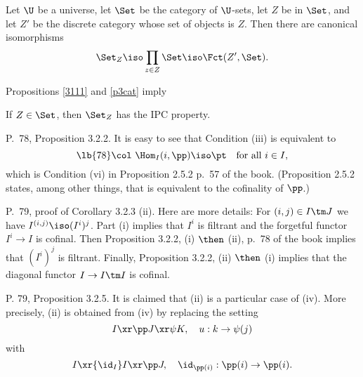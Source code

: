 \documentclass[12pt]{article}
\theoremstyle{remark}
\theoremstyle{definition}
\begin{document}
\begin{s}
\begin{prop}Let $\U$ be a universe, let $\Set$ be the category of $\U$-sets, let $Z$ be in $\Set$, and let $Z'$ be the discrete category whose set of objects is $Z$. Then there are canonical isomorphisms$$\Set_Z\iso\prod_{z\in Z}\Set\iso\Fct(Z',\Set).$$\end{prop}

Propositions \ref{3111} and \ref{p3cat} imply
\begin{prop}  
If $Z\in\Set$, then $\Set_Z$ has the IPC property.
\end{prop}
\end{s} 

%

\begin{s} 
P.~78, Proposition 3.2.2. It is easy to see that Condition (iii) is equivalent to
\begin{equation}\lb{78} 
\col\ \Hom_I(i,\pp)\iso\pt\quad\text{for all }i\in I, 
\end{equation} 
which is Condition (vi) in Proposition 2.5.2 p.~57 of the book. (Proposition 2.5.2 states, among other things, that  is equivalent to the cofinality of $\pp$.)
\end{s}

%

\begin{s} 
P.~79, proof of Corollary 3.2.3 (ii). Here are more details: For $(i,j)\in I\tm J$ we have $I^{(i,j)}\iso(I^i)^j$. Part (i) implies that $I^i$ is filtrant and the forgetful functor $I^i\to I$ is cofinal. Then Proposition 3.2.2, (i) $\then$ (ii), p.~78 of the book implies that $(I^i)^j$ is filtrant. Finally, Proposition 3.2.2, (ii) $\then$ (i) implies that the diagonal functor $I\to I\tm I$ is cofinal.
\end{s}

%

\begin{s}
P. 79, Proposition 3.2.5. It is claimed that (ii) is a particular case of (iv). More precisely, (ii) is obtained from (iv) by replacing the setting 
$$
I\xr\pp J\xr\psi K,\quad u:k\to\psi(j)
$$ 
with 
$$
I\xr{\id_I}I\xr\pp J,\quad\id_{\pp(i)}:\pp(i)\to\pp(i).
$$ 
\end{s}

%
\end{document}

